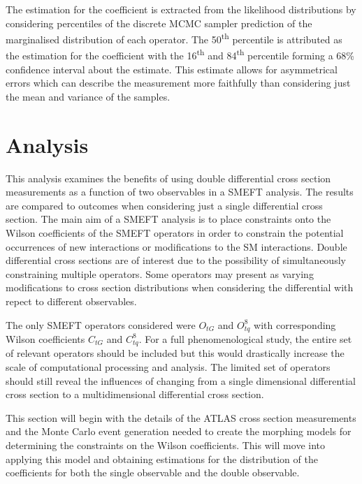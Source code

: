 \documentclass[a4paper,11pt]{article}
\newcommand{\ts}{\textsuperscript}
\begin{document}
The estimation for the coefficient is extracted from the likelihood distributions by considering percentiles of the discrete MCMC sampler prediction of the marginalised distribution of each operator.
The 50\ts{th} percentile is attributed as the estimation for the coefficient with the 16\ts{th} and 84\ts{th} percentile forming a 68\% confidence interval about the estimate.
This estimate allows for asymmetrical errors which can describe the measurement more faithfully than considering just the mean and variance of the samples.

\section{Analysis}\label{sec:analysis}
This analysis examines the benefits of using double differential cross section measurements as a function of two observables in a SMEFT analysis.
The results are compared to outcomes when considering just a single differential cross section.
The main aim of a SMEFT analysis is to place constraints onto the Wilson coefficients of the SMEFT operators in order to constrain the potential occurrences of new interactions or modifications to the SM interactions.
Double differential cross sections are of interest due to the possibility of simultaneously constraining multiple operators.
Some operators may present as varying modifications to cross section distributions when considering the differential with repect to different observables.

The only SMEFT operators considered were $O_{tG}$ and $O_{tq}^{8}$ with corresponding Wilson coefficients $C_{tG}$ and $C_{tq}^8$.
For a full phenomenological study, the entire set of relevant operators should be included but this would drastically increase the scale of computational processing and analysis.
The limited set of operators should still reveal the influences of changing from a single dimensional differential cross section to a multidimensional differential cross section.

This section will begin with the details of the ATLAS cross section measurements and the Monte Carlo event generation needed to create the morphing models for determining the constraints on the Wilson coefficients.
This will move into applying this model and obtaining estimations for the distribution of the coefficients for both the single observable and the double observable.
\end{document}
